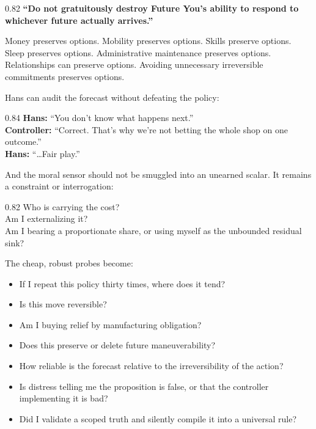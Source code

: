 \documentclass[10pt,letterpaper]{article}
\providecommand{\tightlist}{%
  \setlength{\itemsep}{0.15em}\setlength{\parskip}{0pt}}
\newenvironment{paperbody}
  {\begingroup\justifying}
  {\par\endgroup}
\newenvironment{voicebox}
  {\Needspace{3.5\baselineskip}\par\vspace{0.22em}\begin{center}\begingroup
   \begin{lrbox}{\voiceboxsave}\begin{varwidth}{0.82\linewidth}
   \small\rmfamily\upshape\RaggedRight}
  {\end{varwidth}\end{lrbox}\fbox{\usebox{\voiceboxsave}}
   \endgroup\end{center}\vspace{0.22em}}
\newenvironment{dialoguebox}
  {\Needspace{5\baselineskip}\par\vspace{0.26em}\begin{center}\begingroup
   \begin{lrbox}{\dialogueboxsave}\begin{varwidth}{0.84\linewidth}
   \small\rmfamily\upshape\RaggedRight}
  {\end{varwidth}\end{lrbox}\fbox{\usebox{\dialogueboxsave}}
   \endgroup\end{center}\vspace{0.26em}}
\newenvironment{thesisbox}
  {\Needspace{3.5\baselineskip}\par\vspace{0.32em}\begin{center}\begingroup
   \begin{lrbox}{\thesisboxsave}\begin{varwidth}{0.82\linewidth}
   \normalsize\rmfamily\bfseries\upshape\RaggedRight}
  {\end{varwidth}\end{lrbox}\fbox{\usebox{\thesisboxsave}}
   \endgroup\end{center}\vspace{0.32em}}
\begin{document}
\begin{paperbody}
\begin{thesisbox}
``Do not gratuitously destroy Future You's ability to respond to
whichever future actually arrives.''
\end{thesisbox}

Money preserves options. Mobility preserves options. Skills preserve
options. Sleep preserves options. Administrative maintenance preserves
options. Relationships can preserve options. Avoiding unnecessary
irreversible commitments preserves options.

Hans can audit the forecast without defeating the policy:

\begin{dialoguebox}
\textbf{Hans:} ``You don't know what happens next.''\\[0.35em]
\textbf{Controller:} ``Correct. That's why we're not betting the whole
shop on one outcome.''\\[0.35em]
\textbf{Hans:} ``\ldots Fair play.''
\end{dialoguebox}

And the moral sensor should not be smuggled into an unearned scalar. It
remains a constraint or interrogation:

\begin{voicebox}
Who is carrying the cost?\\
Am I externalizing it?\\
Am I bearing a proportionate share, or using myself as the unbounded
residual sink?
\end{voicebox}

The cheap, robust probes become:

\begin{itemize}
\tightlist
\item
  If I repeat this policy thirty times, where does it tend?
\item
  Is this move reversible?
\item
  Am I buying relief by manufacturing obligation?
\item
  Does this preserve or delete future maneuverability?
\item
  How reliable is the forecast relative to the irreversibility of the
  action?
\item
  Is distress telling me the proposition is false, or that the
  controller implementing it is bad?
\item
  Did I validate a scoped truth and silently compile it into a universal
  rule?
\end{itemize}


\end{paperbody}
\end{document}
